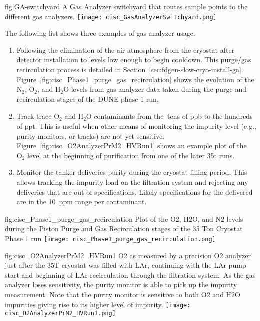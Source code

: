 \begin{dunefigure}{fig:GA-switchyard}
  {A Gas Analyzer switchyard that routes sample points to the different gas analyzers.}
  \texttt{[image: cisc\_GasAnalyzerSwitchyard.png]}
\end{dunefigure}

The following list shows three examples of gas analyzer usage.


\begin{enumerate}
\item Following the elimination of the air atmosphere from the cryostat after detector installation to levels low enough to begin cooldown. This purge/gas recirculation process is detailed in Section~\ref{sec:fdgen-slow-cryo-install-ga}. Figure~\ref{fig:cisc_Phase1_purge_gas_recirculation} shows the evolution of the $\text{N}_2$, $\text{O}_2$, and $\text{H}_2\text{O}$ levels from gas analyzer data taken during the purge and recirculation stages of the DUNE  %
phase 1 run.

\item Track trace $\text{O}_2$ and $\text{H}_2\text{O}$ contaminants from the $\>$tens of ppb to the hundreds of ppt. This is useful when other means of monitoring the impurity level (e.g., purity monitors, or  tracks) are not yet sensitive. Figure~\ref{fig:cisc_O2AnalyzerPrM2_HVRun1} shows an example plot of the $\text{O}_2$ level at the beginning of  purification from one of the later \num{35}\si{t} %
 runs.

\item Monitor the tanker  deliveries purity during the cryostat-filling period. This allows tracking the impurity load on the filtration system and rejecting any deliveries that are out of specifications. Likely specifications for the delivered  are in the \SI{10}{ppm} range per contaminant.

\end{enumerate}

\begin{dunefigure}{fig:cisc_Phase1_purge_gas_recirculation}
  {Plot of the O2, H2O, and N2 levels during the Piston Purge and Gas Recirculation stages of the 35 Ton Cryostat Phase 1 run}
  \texttt{[image: cisc\_Phase1\_purge\_gas\_recirculation.png]}
\end{dunefigure}

\begin{dunefigure}{fig:cisc_O2AnalyzerPrM2_HVRun1}
  {O2 as measured by a precision O2 analyzer just after the 35T cryostat was filled with LAr, continuing with the LAr pump start and beginning of LAr recirculation through the filtration system. As the gas analyzer loses sensitivity, the purity monitor is able to pick up the impurity measurement. Note that the purity monitor is sensitive to both O2 and H2O impurities giving rise to its higher level of impurity.}
  \texttt{[image: cisc\_O2AnalyzerPrM2\_HVRun1.png]}
\end{dunefigure}

